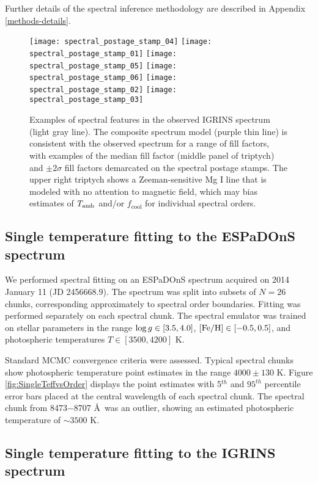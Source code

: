 \documentclass[twocolumn]{emulateapj}%
\begin{document}
Further details of the spectral inference methodology are described in Appendix \ref{methods-details}.


\begin{figure*}
 \centering
 \texttt{[image: spectral\_postage\_stamp\_04]} 
 \texttt{[image: spectral\_postage\_stamp\_01]} 
 \texttt{[image: spectral\_postage\_stamp\_05]} 
 \texttt{[image: spectral\_postage\_stamp\_06]} 
 \texttt{[image: spectral\_postage\_stamp\_02]} 
 \texttt{[image: spectral\_postage\_stamp\_03]} 
 \caption{Examples of spectral features in the observed IGRINS spectrum (light gray line).  The composite spectrum model (purple thin line) is consistent with the observed spectrum for a range of fill factors, with examples of the median fill factor (middle panel of triptych) and $\pm2\sigma$ fill factors demarcated on the spectral postage stamps.  The upper right triptych shows a Zeeman-sensitive Mg I line that is modeled with no attention to magnetic field, which may bias estimates of $T_\textrm{amb}$ and/or $f_{\mathrm{cool}}$ for individual spectral orders.}
 \label{fig:specPostageStamp}
\end{figure*}

\subsection{Single temperature fitting to the ESPaDOnS spectrum}\label{sec:ESP_starfish}

We performed spectral fitting on an ESPaDOnS spectrum acquired on 2014 January 11 (JD 2456668.9).  The spectrum was split into subsets of $N=26$ chunks, corresponding approximately to spectral order boundaries.  Fitting was performed separately on each spectral chunk.  The spectral emulator was trained on stellar parameters in the range $\log g \in [3.5, 4.0]$, $[{\rm Fe}/{\rm H}] \in [-0.5, 0.5]$, and photospheric temperatures $ T \in [3500, 4200]$ K.

Standard MCMC convergence criteria were assessed.  Typical spectral chunks show photospheric temperature point estimates in the range $4000\pm130$ K.  Figure \ref{fig:SingleTeffvsOrder} displays the point estimates with 5$^{th}$ and $95^{th}$ percentile error bars placed at the central wavelength of each spectral chunk.  The spectral chunk from 8473$-$8707 \AA\ was an outlier, showing an estimated photospheric temperature of $\sim3500$ K.

\subsection{Single temperature fitting to the IGRINS spectrum}\label{sec:IGR_starfish}
\end{document}

